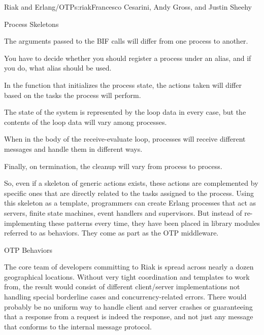 \begin{aosachapter}{Riak and Erlang/OTP}{s:riak}{Francesco Cesarini, Andy Gross, and Justin Sheehy}
\begin{aosasect1}{Process Skeletons}
\begin{aosaitemize}
  \item The arguments passed to the  BIF calls will differ
  from one process to another.

  \item You have to decide whether you should register a process under
  an alias, and if you do, what alias should be used.

  \item In the function that initializes the process state, the actions
  taken will differ based on the tasks the process will perform.

  \item The state of the system is represented by the loop data in every
  case, but the contents of the loop data will vary among processes.

  \item When in the body of the receive-evaluate loop, processes will
  receive different messages and handle them in different ways.

  \item Finally, on termination, the cleanup will vary from process to
  process.

\end{aosaitemize}

So, even if a skeleton of generic actions exists, these actions are
complemented by specific ones that are directly related to the tasks
assigned to the process. Using this skeleton as a template,
programmers can create Erlang processes that act as servers, finite
state machines, event handlers and supervisors. But instead of
re-implementing these patterns every time, they have been placed in
library modules referred to as behaviors. They come as part as the OTP
middleware.

\end{aosasect1}

\begin{aosasect1}{OTP Behaviors}

The core team of developers committing to Riak is spread across nearly
a dozen geographical locations.  Without very tight coordination and
templates to work from, the result would consist of different
client/server implementations not handling special borderline cases
and concurrency-related errors. There would probably be no uniform way
to handle client and server crashes or guaranteeing that a response
from a request is indeed the response, and not just any message that
conforms to the internal message protocol.


\end{aosasect1}
\end{aosachapter}

